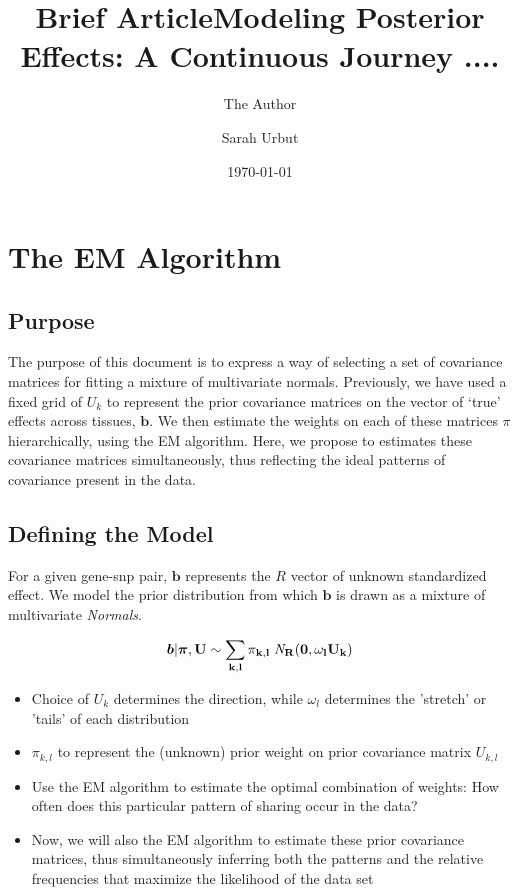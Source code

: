 \documentclass[11pt, oneside]{article}   	%
\title{Brief Article}
\author{The Author}
\title{Modeling Posterior Effects: A Continuous Journey ....}
\author{Sarah Urbut}
\date{\today}
\begin{document}
\section{The EM Algorithm}
\subsection{Purpose}

The purpose of this document is to express a way of selecting a set of covariance matrices for fitting a mixture of multivariate normals. Previously, we have used a fixed grid of $U_k$ to represent the prior covariance matrices on the vector of `true' effects across tissues, $\bm{b}$. We then estimate the weights on each of these matrices $\pi$ hierarchically, using the EM algorithm. Here, we propose to estimates these covariance matrices simultaneously, thus reflecting the ideal patterns of covariance present in the data.


\subsection{Defining the Model}

For a given gene-snp pair, $\bm{b}$ represents the $R$ vector of unknown standardized effect. We model the prior distribution from which $\bm{b}$ is drawn as a mixture of multivariate {\it Normals}.
 
 \begin{equation}
  \label{prior_b_mixt_grid}
  \bm{b} | \bm{\pi},\bf{U} \sim \sum_{k,l} \pi_{k,l} \;{\it N}_R(\bm{0}, \omega_l U_{k})
\end{equation}

\begin{itemize}  
\item Choice of $U_k$ determines the direction, while $\omega_l$ determines the 'stretch' or 'tails' of each distribution
\item $\pi_{k,l}$ to represent the (unknown) prior weight on prior covariance matrix $U_{k,l}$ 
\item  Use the EM algorithm to estimate the optimal combination of weights: How often does this particular pattern of sharing  occur in the data?
\item Now, we will also the EM algorithm to estimate these prior covariance matrices, thus simultaneously inferring both the patterns and the relative frequencies that maximize the likelihood of the data set
\end{itemize} 
\end{document}
